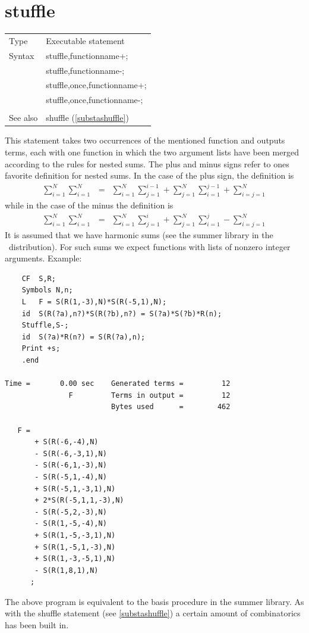%
\section{stuffle}
\label{substastuffle}

\noindent \begin{tabular}{ll}
Type & Executable statement\\
Syntax & stuffle,functionname+; \\
       & stuffle,functionname-; \\
       & stuffle,once,functionname+; \\
       & stuffle,once,functionname-; \\
\\ See also & shuffle (\ref{substashuffle})
\end{tabular} \vspace{4mm}

\noindent This statement 
takes two occurrences of the mentioned function and outputs 
terms, each with one function in which the two argument lists have been 
merged according to the rules for nested sums. The plus and minus signs 
refer to ones favorite definition for nested sums. In the case of the plus 
sign, the definition is
\begin{eqnarray}
    \sum_{i=1}^N \sum_{i=1}^N & = & \sum_{i=1}^N \sum_{j=1}^{i-1}
        + \sum_{j=1}^N \sum_{i=1}^{j-1}
        + \sum_{i=j=1}^N \nonumber
\end{eqnarray}
while in the case of the minus the definition is
\begin{eqnarray}
    \sum_{i=1}^N \sum_{i=1}^N & = & \sum_{i=1}^N \sum_{j=1}^{i}
        + \sum_{j=1}^N \sum_{i=1}^{j}
        - \sum_{i=j=1}^N \nonumber
\end{eqnarray}
It is assumed that we have harmonic sums (see the 
summer library in the \FORM\ distribution). For such sums we expect 
functions with lists of nonzero integer arguments. Example:
\begin{verbatim}
    CF  S,R;
    Symbols N,n;
    L   F = S(R(1,-3),N)*S(R(-5,1),N);
    id  S(R(?a),n?)*S(R(?b),n?) = S(?a)*S(?b)*R(n);
    Stuffle,S-;
    id  S(?a)*R(n?) = S(R(?a),n);
    Print +s;
    .end

Time =       0.00 sec    Generated terms =         12
               F         Terms in output =         12
                         Bytes used      =        462

   F =
       + S(R(-6,-4),N)
       - S(R(-6,-3,1),N)
       - S(R(-6,1,-3),N)
       - S(R(-5,1,-4),N)
       + S(R(-5,1,-3,1),N)
       + 2*S(R(-5,1,1,-3),N)
       - S(R(-5,2,-3),N)
       - S(R(1,-5,-4),N)
       + S(R(1,-5,-3,1),N)
       + S(R(1,-5,1,-3),N)
       + S(R(1,-3,-5,1),N)
       - S(R(1,8,1),N)
      ;
\end{verbatim}
The above program is equivalent to the basis procedure in the summer 
library. As with the shuffle statement (see 
\ref{substashuffle}) a certain amount of combinatorics has been built in.

